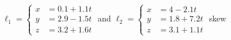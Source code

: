 {$\ell_1 = \left\{\begin{aligned} x&= 0.1+1.1t\\ y&= 2.9-1.5t\\ z&= 3.2+1.6t\end{aligned}\right.$ \quad and \quad
$\ell_2 = \left\{\begin{aligned} x&= 4-2.1t\\ y&= 1.8+7.2t\\ z&= 3.1+1.1t\end{aligned}\right.$
}
{skew
}

